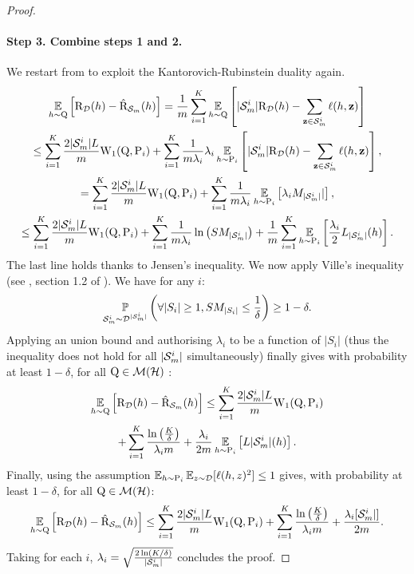 \begin{noaddcontents}
\begin{proof}
    \paragraph{Step 3. Combine steps 1 and 2.}
        We restart from  to exploit the Kantorovich-Rubinstein duality again.
        \begin{multline*}
            \operatorname*{\mathbb{E}}_{h\sim\mathrm{Q}}\Big[ \text{R}_{\mathcal{D}}(h) - \hat{\text{R}}_{\mathcal{S}_m}(h) \Big] =  \frac{1}{m}\sum_{i=1}^{K} \operatorname*{\mathbb{E}}_{h\sim\mathrm{Q}}\left[ |\mathcal{S}_m^{i}|\text{R}_{\mathcal{D}}(h) - \sum_{\mathbf{z}\in\mathcal{S}_m^{i}}\ell(h, \mathbf{z}) \right]\\
            \le \sum_{i=1}^{K} \frac{2|\mathcal{S}_m^{i}|L}{m}\mathrm{W}_{1}(\mathrm{Q}, \mathrm{P}_i) + \sum_{i=1}^{K} \frac{1}{m\lambda_i}\lambda_i\operatorname*{\mathbb{E}}_{h\sim\mathrm{P}_i} \left[ |\mathcal{S}_m^{i}|\text{R}_{\mathcal{D}}(h) - \sum_{\mathbf{z}\in\mathcal{S}_m^{i}} \ell(h, \mathbf{z}) \right], \\
             = \sum_{i=1}^{K} \frac{2|\mathcal{S}_m^{i}|L}{m}\mathrm{W}_{1}(\mathrm{Q}, \mathrm{P}_i) + \sum_{i=1}^{K} \frac{1}{m\lambda_i}\operatorname*{\mathbb{E}}_{h\sim\mathrm{P}_i} \left[ \lambda_i M_{|\mathcal{S}_m^{i}|}| \right], \\
            \le   \sum_{i=1}^{K} \frac{2|\mathcal{S}_m^{i}|L}{m}\mathrm{W}_{1}(\mathrm{Q}, \mathrm{P}_i) + \sum_{i=1}^{K} \frac{1}{m\lambda_i} \ln\left( SM_{|\mathcal{S}_m^{i}|}  \right)
             + \frac{1}{m}\sum_{i=1}^K \operatorname*{\mathbb{E}}_{h\sim\mathrm{P}_i}\left[\frac{\lambda_i}{2} L_{|\mathcal{S}_m^{i}|}(h) \right].
        \end{multline*}
        The last line holds thanks to Jensen's inequality.
        We now apply Ville's inequality (see \eg, section 1.2 of ). We have for any $i$: 
        \begin{align*}
        \operatorname*{\mathbb{P}}_{\mathcal{S}_m^{i} \sim \mathcal{D}^{|\mathcal{S}_m^{i}|}}\left( \forall |S_i|\geq 1, SM_{|S_i|} \leq \frac{1}{\delta}  \right) \geq 1-\delta.
        \end{align*}
        Applying an union bound and authorising $\lambda_i$ to be a function of $|S_i|$ (thus the inequality does not hold for all $|\mathcal{S}_m^{i}|$ simultaneously) finally gives with probability at least $1-\delta$, for all $\mathrm{Q}\in \mathcal{M}(\mathcal{H})$ :
        \begin{multline*}
             \operatorname*{\mathbb{E}}_{h\sim\mathrm{Q}}\Big[ \text{R}_{\mathcal{D}}(h) - \hat{\text{R}}_{\mathcal{S}_m}(h) \Big] \leq    \sum_{i=1}^{K} \frac{2|\mathcal{S}_m^{i}|L}{m}\mathrm{W}_{1}(\mathrm{Q}, \mathrm{P}_i) \\+ \sum_{i=1}^{K}   \frac{\ln\left( \frac{K}{\delta}  \right)}{\lambda_i m} + \frac{\lambda_i}{2m}\operatorname*{\mathbb{E}}_{h\sim\mathrm{P}_i}\left[ L{|\mathcal{S}_m^{i}|}(h) \right].
        \end{multline*}
        Finally, using the assumption $\operatorname*{\mathbb{E}}_{h\sim \mathrm{P}_i}\operatorname*{\mathbb{E}}_{z\sim \mathcal{D}}[\ell(h,z)^2] \leq 1$ gives, with probability at least $1-\delta$, for all $\mathrm{Q}\in \mathcal{M}(\mathcal{H})$:
        \begin{align*}
             \operatorname*{\mathbb{E}}_{h\sim\mathrm{Q}}\Big[ \text{R}_{\mathcal{D}}(h) - \hat{\text{R}}_{\mathcal{S}_m}(h) \Big] \leq    \sum_{i=1}^{K} \frac{2|\mathcal{S}_m^{i}|L}{m}\mathrm{W}_{1}(\mathrm{Q}, \mathrm{P}_i) + \sum_{i=1}^{K}   \frac{\ln\left( \frac{K}{\delta}  \right)}{\lambda_i m} + \frac{\lambda_i[\mathcal{S}_m^{i}|]}{2m}.
        \end{align*}
        Taking for each $i$, $\lambda_i= \sqrt{\frac{2\ln(K/\delta)}{|\mathcal{S}_m^{i}|}}$ concludes the proof.
    \end{proof}
        

\end{noaddcontents}
